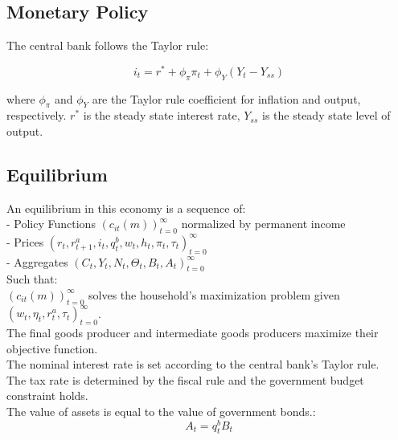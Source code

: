 \documentclass[\econtexRoot/HAFiscal]{subfiles}
\begin{document}
\subsection{Monetary Policy}


The central bank follows the Taylor rule: 

$$i_{t} = r^{*} +\phi_{\pi} \pi_{t}  + \phi_{Y} (Y_{t} -  Y_{ss})$$ 


where $\phi_{\pi}$ and $\phi_{Y} $ are the Taylor rule coefficient for inflation and output, respectively.  $r^{*}$ is the steady state interest rate, $Y_{ss}$ is the steady state level of output. \\

\subsection{Equilibrium}


An equilibrium in this economy is a sequence of: \\

- Policy Functions $\left( c_{it}(m) \right )_{t=0}^{\infty}$ normalized by permanent income \\

- Prices $ \left(r_{t},  r^{a}_{t+1}, i_{t}, q^{b}_{t},  w_{t}, h_{t} , \pi_{t} , \tau_{t} \right) _{t=0}^{\infty}$\\

- Aggregates $ \left(C_{t}, Y_{t} , N_{t},   \Theta_{t},  B_{t} , A_{t}  \right)_{t=0}^{\infty}$\\

Such that: \\

$ \left(  c_{it}(m)\right)_{t=0}^{\infty}$  solves the household's maximization problem given $  \left( w_{t}, \eta_{t},  r^{a}_{t} , \tau_{t} \right)_{t=0}^{\infty}$.\\

The final goods producer and intermediate goods producers maximize their objective function. \\

The nominal interest rate is set according to the central bank's Taylor rule. \\

The tax rate is determined by the fiscal rule and the government budget constraint holds. \\

The value of assets is equal to the value of government bonds.:
 $$ A_t =  q^{b}_{t}B_{t}  $$
\end{document}
